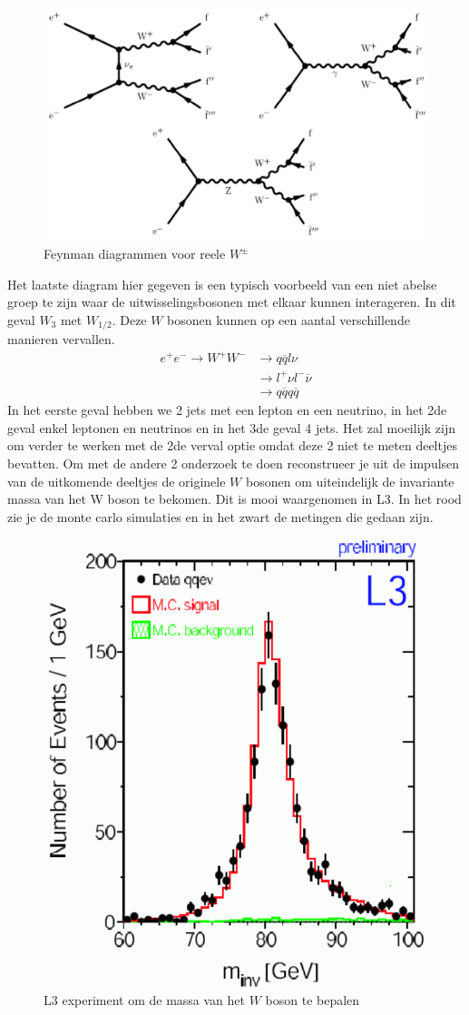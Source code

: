 \documentclass[../main.tex]{subfiles}
\begin{document}
\begin{figure}[h]
    \centering
    \includegraphics[width=0.6\linewidth]{elektroweak_precision_tests/reele_w_diagrammen.png}
    \caption{Feynman diagrammen voor reele $W^\pm$}%
    \label{fig:elektroweak_precision_tests/reele_w_diagrammen}
\end{figure}

Het laatste diagram hier gegeven is een typisch voorbeeld van een niet abelse groep te zijn waar de uitwisselingsbosonen met elkaar kunnen interageren. In dit geval $W_3$ met $W_{1/2}$. Deze $W$ bosonen kunnen op een aantal verschillende manieren vervallen.
\begin{equation}
    \begin{aligned}
        \label{eq:verval_w_boson}
        e^+e^- \rightarrow W^+W^- &\rightarrow q\overline q l\nu\\
                                  &\rightarrow l^+\nu l^-\overline \nu\\
                                  &\rightarrow q\overline q q\overline q
    \end{aligned}
\end{equation}
In het eerste geval hebben we 2 jets met een lepton en een neutrino, in het 2de geval enkel leptonen en neutrinos en in het 3de geval 4 jets. Het zal moeilijk zijn om verder te werken met de 2de verval optie omdat deze 2 niet te meten deeltjes bevatten. Om met de andere 2 onderzoek te doen reconstrueer je uit de impulsen van de uitkomende deeltjes de originele $W$ bosonen om uiteindelijk de invariante massa van het W boson te bekomen. Dit is mooi waargenomen in L3. In het rood zie je de monte carlo simulaties en in het zwart de metingen die gedaan zijn.

\begin{figure}[h]
    \centering
    \includegraphics[width=0.4\linewidth]{elektroweak_precision_tests/invar_massa_w.png}
    \caption{L3 experiment om de massa van het $W$ boson te bepalen}%
    \label{fig:elektroweak_precision_tests/invar_massa_w}
\end{figure}
\end{document}
